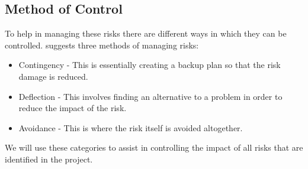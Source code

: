 \documentclass{article}
\begin{document}
\subsection{Method of Control}
To help in managing these risks there are different ways in which they can be controlled. \textcite[][87]{dawson15} suggests three methods of managing risks:
\begin{itemize}
    \item Contingency - This is essentially creating a backup plan so that the risk damage is reduced.
    \item Deflection - This involves finding an alternative to a problem in order to reduce the impact of the risk.
    \item Avoidance - This is where the risk itself is avoided altogether.
\end{itemize}
We will use these categories to assist in controlling the impact of all risks that are identified in the project.
\par
\end{document}
